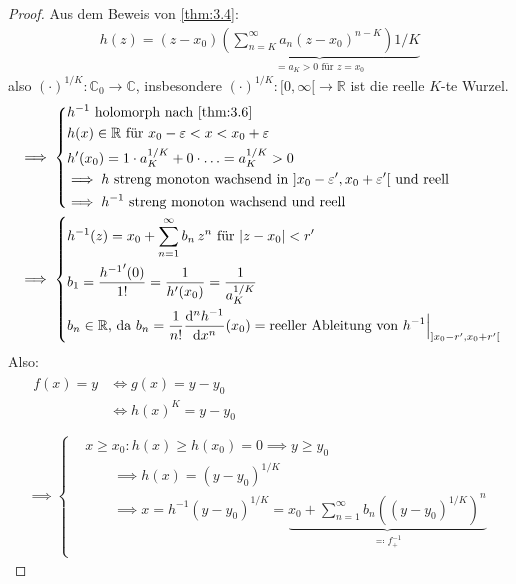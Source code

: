 \begin{theorem}[Satz]
\begin{proof}
    Aus dem Beweis von \ref{thm:3.4}:
    \begin{align*}
      h(z) = (z-x_0) \underbrace{\left( \sum\limits_{n=K}^{\infty} a_n (z-x_0)^{n-K} \right){1/K}}_{=a_K > 0 \text{ für } z=x_0}
    \end{align*}
    also $(\cdot)^{1/K} : \mathbb{C}_0 \to \mathbb{C}$, insbesondere $(\cdot)^{1/K} : [0,\infty[ \to \mathbb{R}$ ist die reelle $K$-te Wurzel.
    \begin{align*}
      &\implies
      \begin{dcases}
        h^{-1} \text{ holomorph nach \ref{thm:3.6}} \\
        h(x) \in \mathbb{R} \text{ für } x_0-\varepsilon < x < x_0+\varepsilon \\
        h'(x_0) = 1 \cdot a_K^{1/K} + 0 \cdot \ldots = a_K^{1/K} > 0 \\
        \implies h \text{ streng monoton wachsend in } ]x_0-\varepsilon',x_0+\varepsilon'[ \text{ und reell} \\
        \implies h^{-1} \text{ streng monoton wachsend und reell}
      \end{dcases} \\
      &\implies
      \begin{dcases}
        h^{-1}(z) = x_0 + \sum\limits_{n=1}^{\infty} b_n \, z^n \text{ für } |z-x_0| < r' \\
        b_1 = \frac{{h^{-1}}'(0)}{1!} = \frac{1}{h'(x_0)} = \frac{1}{a_K^{1/K}} \\
        b_n \in \mathbb{R} \text{, da } b_n = \frac{1}{n!} \frac{\mathrm{d}^n h^{-1}}{\mathrm{d}x^n}(x_0) = \text{reeller Ableitung von } h^{-1}\Big|_{]x_0-r',x_0+r'[}
      \end{dcases} \\
    \end{align*}
    Also: 
    \begin{gather*}
      \begin{aligned}
        f(x) = y
        &\iff g(x) = y-y_0 \\
        &\iff h(x)^K = y-y_0 \\
      \end{aligned} \\
      \implies
      \left\{
      \begin{aligned}
        &x \geq x_0 : h(x) \geq h(x_0) = 0 \implies y \geq y_0 \\
        &\qquad \implies h(x) = (y-y_0)^{1/K} \\
        &\qquad \implies x = h^{-1} (y-y_0)^{1/K} = \underbrace{x_0 + \sum\limits_{n=1}^{\infty} b_n \left( (y-y_0)^{1/K} \right)^n}_{\eqcolon f_{+}^{-1}} \\

\end{aligned}
\end{gather*}
\end{proof}
\end{theorem}
